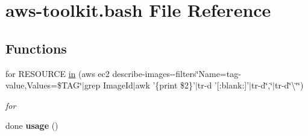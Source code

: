 \hypertarget{aws-toolkit_8bash}{\section{aws-\/toolkit.bash File Reference}
\label{aws-toolkit_8bash}
}
\subsection*{Functions}
\begin{DoxyCompactItemize}
\item 
\hypertarget{aws-toolkit_8bash_ad20b974a24d3991d708fae120975fb17}{for R\-E\-S\-O\-U\-R\-C\-E \hyperlink{aws-toolkit_8bash_ad20b974a24d3991d708fae120975fb17}{in} (aws ec2 describe-\/images-\/-\/filters\char`\"{}Name=tag-\/value,Values=\$T\-A\-G\char`\"{}$\vert$grep Image\-Id$\vert$awk '\{print \$2\}'$\vert$tr-\/d '\mbox{[}\-:blank\-:\mbox{]}'$\vert$tr-\/d\char`\"{},\char`\"{}$\vert$tr-\/d\char`\"{}\textbackslash{}\char`\"{}\char`\"{})}\label{aws-toolkit_8bash_ad20b974a24d3991d708fae120975fb17}

\begin{DoxyCompactList}\small\item\em for \end{DoxyCompactList}\item 
\hypertarget{aws-toolkit_8bash_a833e19e9f5f722f6feaada3a3a2ad56b}{done {\bfseries usage} ()}\label{aws-toolkit_8bash_a833e19e9f5f722f6feaada3a3a2ad56b}

\end{DoxyCompactItemize}
